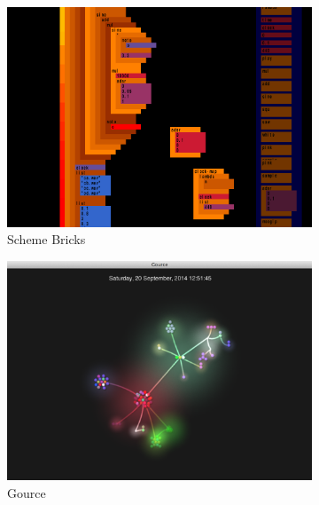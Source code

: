 \begin{figure}
\centering
\begin{subfigure}{.5\textwidth}
  \centering
  \includegraphics[width=.95\linewidth]{../images/code-visualisations/scheme-bricks.png}
  \caption{Scheme Bricks}
  \label{fig:scheme-bricks}
\end{subfigure}%
\begin{subfigure}{.5\textwidth}
  \centering
  \includegraphics[width=.95\linewidth]{../images/code-visualisations/gource.png}
  \caption{Gource}
  \label{fig:gource}
\end{subfigure}\\
\begin{subfigure}{.5\textwidth}
  \centering

\end{subfigure}
\end{figure}
